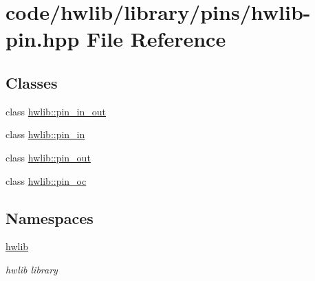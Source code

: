 \hypertarget{hwlib-pin_8hpp}{}\section{code/hwlib/library/pins/hwlib-\/pin.hpp File Reference}
\label{hwlib-pin_8hpp}
\subsection*{Classes}
\begin{DoxyCompactItemize}
\item 
class \hyperlink{classhwlib_1_1pin__in__out}{hwlib\+::pin\+\_\+in\+\_\+out}
\item 
class \hyperlink{classhwlib_1_1pin__in}{hwlib\+::pin\+\_\+in}
\item 
class \hyperlink{classhwlib_1_1pin__out}{hwlib\+::pin\+\_\+out}
\item 
class \hyperlink{classhwlib_1_1pin__oc}{hwlib\+::pin\+\_\+oc}
\end{DoxyCompactItemize}
\subsection*{Namespaces}
\begin{DoxyCompactItemize}
\item 
 \hyperlink{namespacehwlib}{hwlib}
\begin{DoxyCompactList}\small\item\em hwlib library \end{DoxyCompactList}\end{DoxyCompactItemize}
